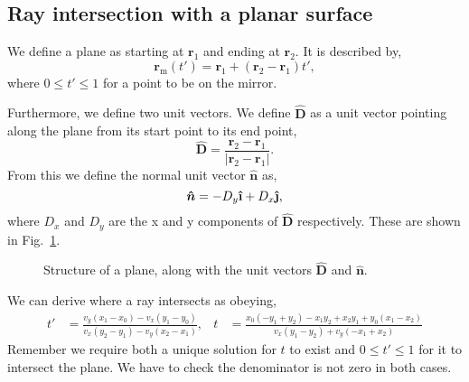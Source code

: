 \documentclass{article}
\let\vec \bm
\newcommand{\uveci}{{\bm{\hat{\textnormal{\bfseries\i}}}}}
\newcommand{\uvecj}{{\bm{\hat{\textnormal{\bfseries\j}}}}}
\begin{document}
\subsection{Ray intersection with a planar surface}
We define a plane as starting at $\vec{r}_1$ and ending at $\vec{r}_2$. It is described by,
\begin{equation}
    \vec{r}_\mathrm{m}(t')
    =
    \vec{r}_1 + (\vec{r}_2 - \vec{r}_1) t',
\end{equation}
where $0 \le t' \le 1$ for a point to be on the mirror. 

Furthermore, we define two unit vectors. We define $\vec{\hat{D}}$ as a unit vector pointing along the plane from its start point to its end point,
\begin{equation}
    \vec{\hat{D}}
    =
    \frac{\vec{r}_2 - \vec{r}_1}{|\vec{r}_2 - \vec{r}_1|}.
\end{equation}
From this we define the normal unit vector $\vec{\hat n}$ as,
\begin{equation}
\label{eq:normal_vec_def}
    \vec{\hat n}
    =
    - D_y \uveci + D_x \uvecj,
\end{equation}
where $D_x$ and $D_y$ are the x and y components of $\vec{\hat {D}}$ respectively. These are shown in Fig.~\ref{fig:plane_structure}.
\begin{figure}
    \centering
    \caption{Structure of a plane, along with the unit vectors $\vec{\hat{D}}$ and $\vec{\hat{n}}$.}
    \label{fig:plane_structure}
\end{figure}

We can derive where a ray intersects as obeying,
\begin{align}
    t'
    &=
    \frac{v_y(x_1 - x_0) - v_x(y_1 - y_0)}{v_x(y_2 - y_1) - v_y(x_2 - x_1)}, &
    t
    &=
    \frac{x_{0} \left(- y_{1} + y_{2}\right) - x_{1} y_{2} + x_{2} y_{1} + y_{0} \left(x_{1} - x_{2}\right)}{v_{x} \left(y_{1} - y_{2}\right) + v_{y} \left(- x_{1} + x_{2}\right)}
\end{align}
Remember we require both a unique solution for $t$ to exist and $0 \le t' \le 1$ for it to intersect the plane. We have to check the denominator is not zero in both cases.
\end{document}
